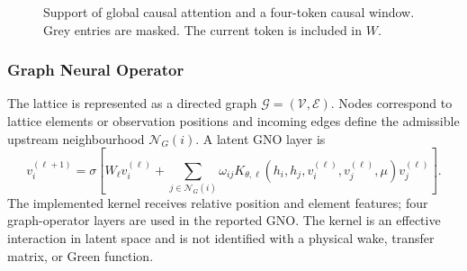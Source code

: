 \begin{figure}[H]
    \centering
    \caption{Support of global causal attention and a four-token causal window. Grey entries are masked. The current token is included in $W$.}
    \label{fig:causal_window_masks}
\end{figure}

\subsubsection{Graph Neural Operator}
\label{subsec:graph_neural_operator}

The lattice is represented as a directed graph $\mathcal{G}=(\mathcal{V},\mathcal{E})$. Nodes correspond to lattice elements or observation positions and incoming edges define the admissible upstream neighbourhood $\mathcal{N}_{G}(i)$. A latent GNO layer is
\begin{equation}
    v_i^{(\ell+1)}
    =
    \sigma\!\left[
        W_{\ell}v_i^{(\ell)}
        +
        \sum_{j\in\mathcal{N}_{G}(i)}
        \omega_{ij}
        K_{\theta,\ell}
        \left(h_i,h_j,v_i^{(\ell)},v_j^{(\ell)},\mu\right)
        v_j^{(\ell)}
    \right].
    \label{eq:gno_message_passing_revised}
\end{equation}
The implemented kernel receives relative position and element features; four graph-operator layers are used in the reported GNO. The kernel is an effective interaction in latent space and is not identified with a physical wake, transfer matrix, or Green function.


